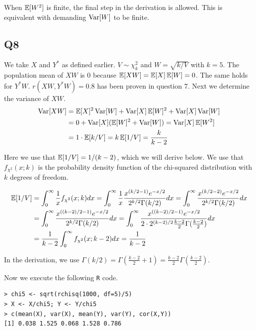 When $\operatorname{\mathbb{E}}[W^2]$ is finite, the final step in the derivation is allowed. This is equivalent with demanding $\operatorname{\text{Var}}[W]$ to be finite.

\subsection*{Q8}

We take $X$ and $Y^*$ as defined earlier. $V \sim \chi^2_k$ and $W = \sqrt{k/V}$ with $k=5$.  The population mean of $XW$ is $0$ because $\operatorname{\mathbb{E}}[XW] = \operatorname{\mathbb{E}}[X]\operatorname{\mathbb{E}}[W] = 0$. The same holds for $Y^{*}W$. $r(XW,Y^{*}W) = 0.8$ has been proven in question $7$.
Next we determine the variance of $XW$.
\begin{align*}
\operatorname{\text{Var}}[XW] & = \operatorname{\mathbb{E}}[X]^2 \operatorname{\text{Var}}[W] + \operatorname{\text{Var}}[X] \operatorname{\mathbb{E}}[W]^2 + \operatorname{\text{Var}}[X]\operatorname{\text{Var}}[W] \\
         & =  0 + \operatorname{\text{Var}}[X](\operatorname{\mathbb{E}}[W]^2 + \operatorname{\text{Var}}[W]) = \operatorname{\text{Var}}[X]\operatorname{\mathbb{E}}[W^2] \\
         & = 1 \cdot \operatorname{\mathbb{E}}[k/V] = k \operatorname{\mathbb{E}}[1/V] = \frac{k}{k-2}
\end{align*}

Here we use that $\operatorname{\mathbb{E}}[1/V] = 1/(k-2)$, which we will derive below. We use that $f_{\chi^2}(x; k)$ is the probability density function of the chi-squared distribution with $k$ degrees of freedom.

\begin{align*}
\operatorname{\mathbb{E}}[1/V] & = \int_{0}^{\infty} \frac{1}{x} f_{\chi^2}(x; k) dx = \int_{0}^{\infty} \frac{1}{x} \frac{x^{\left( k/2 - 1\right) }e^{-x/2}}{2^{k/2}\Gamma(k/2)} dx = \int_{0}^{\infty} \frac{x^{\left( k/2 - 2\right) }e^{-x/2}}{2^{k/2}\Gamma(k/2)} dx \\
        & = \int_{0}^{\infty} \frac{x^{\left(\left(k-2\right)/2 - 1\right) }e^{-x/2}}{2^{k/2}\Gamma(k/2)} dx = \int_{0}^{\infty} \frac{x^{\left(\left(k-2\right)/2 - 1\right) }e^{-x/2}}{2 \cdot 2^{\left(k-2\right)/2}\frac{k-2}{2} \Gamma(\frac{k-2}{2})} dx \\
        & = \frac{1}{k-2} \int_{0}^{\infty} f_{\chi^2}(x; k-2) dx = \frac{1}{k-2}
\end{align*}

In the derivation, we use $\Gamma(k/2) = \Gamma(\frac{k-2}{2} + 1) = \frac{k-2}{2} \Gamma(\frac{k-2}{2})$.

Now we execute the following \verb|R| code.

\begin{verbatim}
> chi5 <- sqrt(rchisq(1000, df=5)/5)
> X <- X/chi5; Y <- Y/chi5 
> c(mean(X), var(X), mean(Y), var(Y), cor(X,Y))
[1] 0.038 1.525 0.068 1.528 0.786
\end{verbatim}

